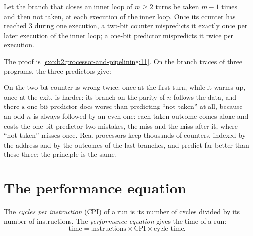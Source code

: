 \label{lst:b2:processor-and-pipelining:two-bit}

\begin{proposition}\label{prop:b2:processor-and-pipelining:two-bit}
Let the branch that closes an inner loop of $m \ge 2$ turns be taken $m - 1$ times and then not taken, at each
execution of the inner loop. Once its counter has reached 3 during one execution, a two-bit counter mispredicts it
exactly once per later execution of the inner loop; a one-bit predictor mispredicts it twice per execution.
\end{proposition}

The proof is \cref{exo:b2:processor-and-pipelining:11}. On the branch traces of three programs, the three predictors
give:

\label{out:b2:processor-and-pipelining:branches}

On  the two-bit counter is wrong twice: once at the first turn, while it warms up, once at the exit.
 is harder: its branch on the parity of $n$ follows the data, and there a one-bit predictor does
worse than predicting ``not taken'' at all, because an odd $n$ is always followed by an even one: each taken outcome
comes alone and costs the one-bit predictor two mistakes, the miss and the miss after it, where ``not taken'' misses
once. Real
processors keep thousands of counters, indexed by the address and by the outcomes of the last branches, and predict
far better than these three; the principle is the same.

\section{The performance equation}\label{sec:b2:processor-and-pipelining:performance}

\begin{definition}\label{def:b2:processor-and-pipelining:cpi}
The \emph{cycles per instruction} (CPI) of a run is its number of cycles divided by its
number of instructions. The \emph{performance equation} gives the time of a run:
\[
\text{time} = \text{instructions} \times \text{CPI} \times \text{cycle time}.
\]
\end{definition}

